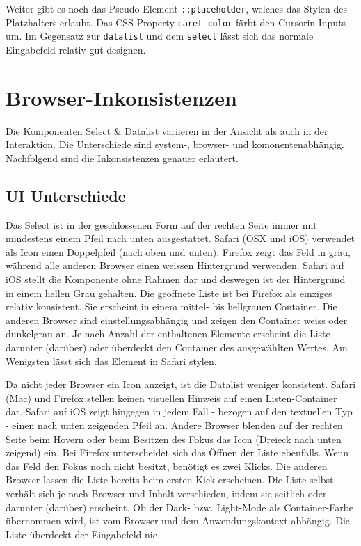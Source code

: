 Weiter gibt es noch das Pseudo-Element \texttt{::placeholder}, welches das Stylen des Platzhalters erlaubt.
Das CSS-Property \texttt{caret-color} färbt den Cursor\footnotemark in Inputs um.
Im Gegensatz zur \texttt{datalist} und dem \texttt{select} lässt sich das normale Eingabefeld relativ gut designen. 


\clearpage
\section{Browser-Inkonsistenzen}
\label{sec:browserInconsistency}

Die Komponenten Select \& Datalist variieren in der Ansicht als auch in der Interaktion. 
Die Unterschiede sind system-, browser- und komonentenabhängig. 
Nachfolgend sind die Inkonsistenzen genauer erläutert. 


\subsection{UI Unterschiede}
\label{sec:uiDifferences}

Das Select ist in der geschlossenen Form auf der rechten Seite immer mit mindestens einem Pfeil nach unten ausgestattet.
Safari (OSX und iOS) verwendet als Icon einen Doppelpfeil (nach oben und unten).
Firefox zeigt das Feld in grau, während alle anderen Browser einen weissen Hintergrund verwenden.
Safari auf iOS stellt die Komponente ohne Rahmen dar und deswegen ist der Hintergrund in einem hellen Grau gehalten.
Die geöffnete Liste ist bei Firefox als einziges relativ konsistent. 
Sie erscheint in einem mittel- bis hellgrauen Container.
Die anderen Browser sind einstellungsabhängig und zeigen den Container weiss oder dunkelgrau an.
Je nach Anzahl der enthaltenen Elemente erscheint die Liste darunter (darüber) oder überdeckt den Container des ausgewählten Wertes.
Am Wenigsten lässt sich das Element in Safari stylen.

Da nicht jeder Browser ein Icon anzeigt, ist die Datalist weniger konsistent.
Safari (Mac) und Firefox stellen keinen visuellen Hinweis auf einen Listen-Container dar.
Safari auf iOS zeigt hingegen in jedem Fall - bezogen auf den textuellen Typ - einen nach unten zeigenden Pfeil an.
Andere Browser blenden auf der rechten Seite beim Hovern oder beim Besitzen des Fokus das Icon (Dreieck nach unten zeigend) ein.
Bei Firefox unterscheidet sich das Öffnen der Liste ebenfalls. 
Wenn das Feld den Fokus noch nicht besitzt, benötigt es zwei Klicks.
Die anderen Browser lassen die Liste bereits beim ersten Kick erscheinen.
Die Liste selbst verhält sich je nach Browser und Inhalt verschieden, indem sie seitlich oder darunter (darüber) erscheint.
Ob der Dark- bzw. Light-Mode als Container-Farbe übernommen wird, ist vom Browser und dem Anwendungskontext abhängig.
Die Liste überdeckt der Eingabefeld nie. 

